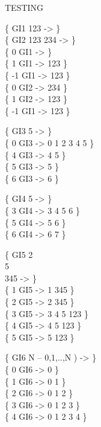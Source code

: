 \begin{tt}
TESTING        

\{ \word{:} GI1  123  \word{;} -> \} \\
\{ \word{:} GI2  123  234  \word{;} -> \} \\
\{  0 GI1 ->     \} \\
\{  1 GI1 -> 123 \} \\
\{ -1 GI1 -> 123 \} \\
\{  0 GI2 -> 234 \} \\
\{  1 GI2 -> 123 \} \\
\{ -1 GI1 -> 123 \}

\{ \word{:} GI3   5      \word{;} -> \} \\
\{ 0 GI3 -> 0 1 2 3 4 5 \} \\
\{ 4 GI3 -> 4 5 \} \\
\{ 5 GI3 -> 5 \} \\
\{ 6 GI3 -> 6 \}

\{ \word{:} GI4     5   \word{;} -> \} \\
\{ 3 GI4 -> 3 4 5 6 \} \\
\{ 5 GI4 -> 5 6 \} \\
\{ 6 GI4 -> 6 7 \}

\{ \word{:} GI5   2   \\
\tab {} 5      \\
  345  \word{;} -> \} \\
\{ 1 GI5 -> 1 345 \} \\
\{ 2 GI5 -> 2 345 \} \\
\{ 3 GI5 -> 3 4 5 123 \} \\
\{ 4 GI5 -> 4 5 123 \} \\
\{ 5 GI5 -> 5 123 \}

\{ \word{:} GI6  N -- 0,1,..,N )  
	    
	 \word{;} -> \} \\
\{ 0 GI6 -> 0 \} \\
\{ 1 GI6 -> 0 1 \} \\
\{ 2 GI6 -> 0 1 2 \} \\
\{ 3 GI6 -> 0 1 2 3 \} \\
\{ 4 GI6 -> 0 1 2 3 4 \}
\end{tt}

